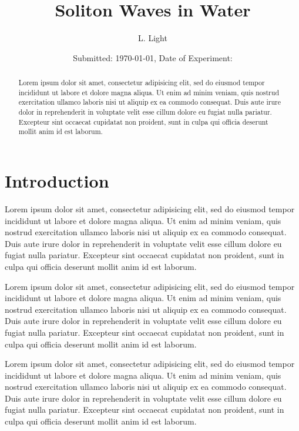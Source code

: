 \documentclass[10pt, twocolumn]{revtex4}    %
\begin{document}
\title{Soliton Waves in Water}
\date{Submitted: \today{}, Date of Experiment: }
\author{L. Light}

\begin{abstract}
Lorem ipsum dolor sit amet, consectetur adipisicing elit, sed do eiusmod tempor incididunt ut labore et dolore magna aliqua. Ut enim ad minim veniam, quis nostrud exercitation ullamco laboris nisi ut aliquip ex ea commodo consequat. Duis aute irure dolor in reprehenderit in voluptate velit esse cillum dolore eu fugiat nulla pariatur. Excepteur sint occaecat cupidatat non proident, sunt in culpa qui officia deserunt mollit anim id est laborum.
\end{abstract}

\maketitle
\thispagestyle{plain} %



\section{Introduction}
Lorem ipsum dolor sit amet, consectetur adipisicing elit, sed do eiusmod tempor incididunt ut labore et dolore magna aliqua. Ut enim ad minim veniam, quis nostrud exercitation ullamco laboris nisi ut aliquip ex ea commodo consequat. Duis aute irure dolor in reprehenderit in voluptate velit esse cillum dolore eu fugiat nulla pariatur. Excepteur sint occaecat cupidatat non proident, sunt in culpa qui officia deserunt mollit anim id est laborum.


Lorem ipsum dolor sit amet, consectetur adipisicing elit, sed do eiusmod tempor incididunt ut labore et dolore magna aliqua. Ut enim ad minim veniam, quis nostrud exercitation ullamco laboris nisi ut aliquip ex ea commodo consequat. Duis aute irure dolor in reprehenderit in voluptate velit esse cillum dolore eu fugiat nulla pariatur. Excepteur sint occaecat cupidatat non proident, sunt in culpa qui officia deserunt mollit anim id est laborum.


Lorem ipsum dolor sit amet, consectetur adipisicing elit, sed do eiusmod tempor incididunt ut labore et dolore magna aliqua. Ut enim ad minim veniam, quis nostrud exercitation ullamco laboris nisi ut aliquip ex ea commodo consequat. Duis aute irure dolor in reprehenderit in voluptate velit esse cillum dolore eu fugiat nulla pariatur. Excepteur sint occaecat cupidatat non proident, sunt in culpa qui officia deserunt mollit anim id est laborum.
\end{document}
